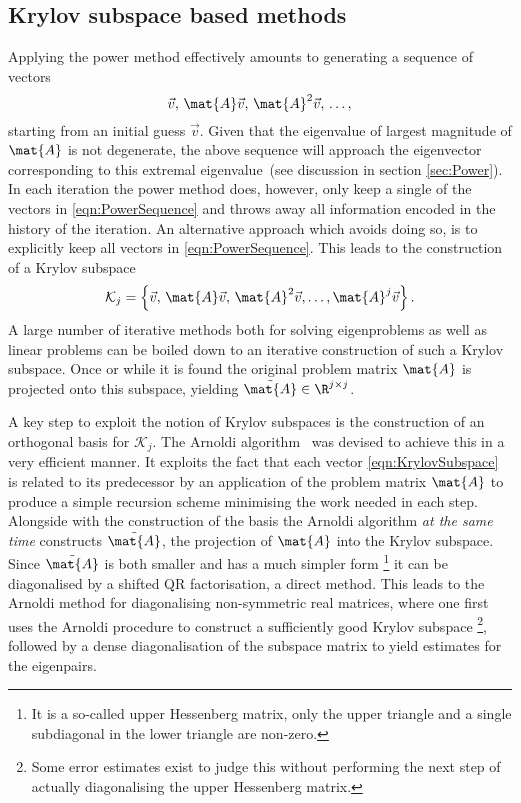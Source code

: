 
\subsection{Krylov subspace based methods}
\label{sec:Arnoldi}
Applying the power method
effectively amounts to generating a sequence of vectors
\begin{equation}
	\vec{v}, \, \mat{A} \vec{v}, \, \mat{A}^2 \vec{v}, \, \ldots,
	\label{eqn:PowerSequence}
\end{equation}
starting from an initial guess $\vec{v}$.
Given that the eigenvalue of largest magnitude of $\mat{A}$ is not degenerate,
the above sequence will approach the eigenvector corresponding to this
extremal eigenvalue~(see discussion in section \ref{sec:Power}).
In each iteration the power method does, however,
only keep a single of the vectors in \eqref{eqn:PowerSequence}
and throws away all information encoded in the history of the iteration.
An alternative approach which avoids doing so, is
to explicitly keep all vectors in \eqref{eqn:PowerSequence}.
This leads to the construction of a Krylov subspace~\cite{Arbenz2010}
\begin{equation}
	\mathcal{K}_j = \left\{\vec{v},\, \mat{A} \vec{v},\, \mat{A}^2 \vec{v},
	\ldots, \mat{A}^j \vec{v} \right\}.
	\label{eqn:KrylovSubspace}
\end{equation}
A large number of iterative methods both for solving eigenproblems
as well as linear problems
can be boiled down to an iterative construction of such a Krylov subspace.
Once or while it is found the original problem matrix $\mat{A}$
is projected onto this subspace, yielding $\tilde{\mat{A}} \in \R^{j \times j}$.

A key step to exploit the notion of Krylov subspaces
is the construction of an orthogonal basis for $\mathcal{K}_j$.
The Arnoldi algorithm~\cite{Arnoldi1951}
was devised to achieve this in a very efficient manner.
It exploits the fact that each vector \eqref{eqn:KrylovSubspace}
is related to its predecessor by an application of the problem matrix $\mat{A}$
to produce a simple recursion scheme minimising the work needed in each step.
Alongside with the construction of the basis the Arnoldi algorithm
\emph{at the same time} constructs $\tilde{\mat{A}}$,
the projection of $\mat{A}$ into the Krylov subspace.
Since $\tilde{\mat{A}}$ is both smaller and has a much simpler form%
\footnote{It is a so-called upper Hessenberg matrix,
	\ie only the upper triangle and a single subdiagonal in the lower
	triangle are non-zero.}
it can be diagonalised by a shifted QR factorisation,
a direct method.
This leads to the Arnoldi method for diagonalising
non-symmetric real matrices,
where one first uses the Arnoldi procedure to construct a sufficiently
good Krylov subspace%
\footnote{Some error estimates exist to judge this without performing
the next step of actually diagonalising the upper Hessenberg matrix.},
followed by a dense diagonalisation of the subspace matrix
to yield estimates for the eigenpairs.

